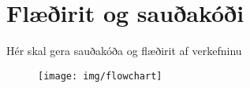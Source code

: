 \section{Flæðirit og sauðakóði}
Hér skal gera sauðakóða og flæðirit af verkefninu 
\begin{figure}[h]
\texttt{[image: img/flowchart]}
\end{figure}